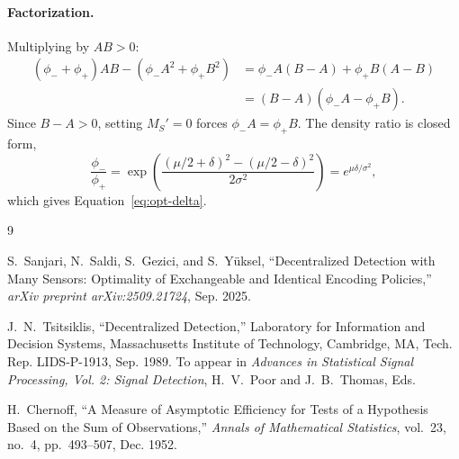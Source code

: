 \documentclass[11pt]{article}
\begin{document}
\paragraph{Factorization.} Multiplying by $AB>0$:
\begin{align}
    (\phi_-+\phi_+)AB - (\phi_-A^2+\phi_+B^2) &= \phi_-A(B-A) + \phi_+B(A-B) \nonumber\\
    &= (B-A)(\phi_-A-\phi_+B).
\end{align}
Since $B-A>0$, setting $M_S'=0$ forces $\phi_-A=\phi_+B$. The density ratio is closed form,
\begin{equation}
    \frac{\phi_-}{\phi_+} = \exp\left(\frac{(\mu/2+\delta)^2-(\mu/2-\delta)^2}{2\sigma^2}\right) = e^{\mu\delta/\sigma^2},
\end{equation}
which gives Equation~\eqref{eq:opt-delta}.

\begin{thebibliography}{9}

S.~Sanjari, N.~Saldi, S.~Gezici, and S.~Y\"uksel, ``Decentralized Detection with Many Sensors: Optimality of Exchangeable and Identical Encoding Policies,'' \emph{arXiv preprint arXiv:2509.21724}, Sep. 2025.

J.~N.~Tsitsiklis, ``Decentralized Detection,'' Laboratory for Information and Decision Systems, Massachusetts Institute of Technology, Cambridge, MA, Tech. Rep. LIDS-P-1913, Sep. 1989. To appear in \emph{Advances in Statistical Signal Processing, Vol. 2: Signal Detection}, H.~V.~Poor and J.~B.~Thomas, Eds.

H.~Chernoff, ``A Measure of Asymptotic Efficiency for Tests of a Hypothesis Based on the Sum of Observations,'' \emph{Annals of Mathematical Statistics}, vol.~23, no.~4, pp.~493--507, Dec. 1952.

\end{thebibliography}
\end{document}
